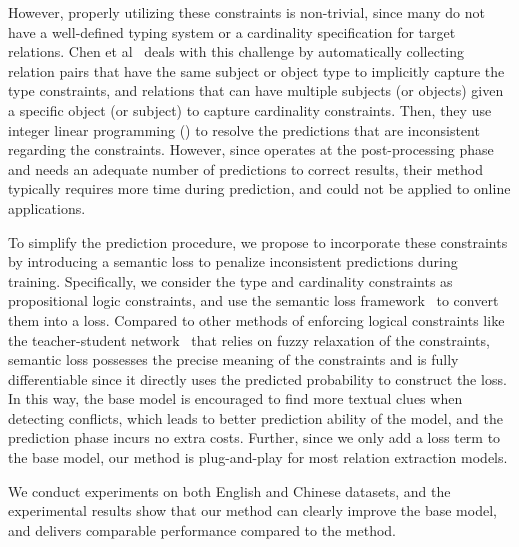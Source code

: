 However, properly utilizing these constraints is non-trivial, since many \KBs do not have a well-defined typing system or a cardinality specification for target relations.
Chen et al~ deals with this challenge by automatically collecting relation pairs that have the same subject or object type to implicitly capture the type constraints, and relations that can have multiple subjects (or objects) given a specific object (or subject) to capture cardinality constraints.
Then, they use  integer linear programming (\ILP) to resolve the predictions that are inconsistent regarding the constraints.
However, since \ILP operates at the post-processing phase and needs an adequate number of predictions to correct results, their method typically requires more time during prediction, 
and could not be applied to online applications.

To simplify the prediction procedure,
we propose to incorporate these constraints by introducing a semantic loss to penalize inconsistent predictions during training.
Specifically, we consider the type and cardinality constraints as propositional logic constraints, and use the semantic loss framework~\cite{xu2017semantic} to convert them into a loss.
Compared to other methods of enforcing logical constraints like the teacher-student network~\cite{hu2016harnessing} that relies on fuzzy relaxation of the constraints, semantic loss possesses the precise meaning of the constraints and is fully differentiable since it directly uses the predicted probability to construct the loss.
In this way, the base model is encouraged to find more textual clues when detecting conflicts, which leads to better prediction ability of the model, and the prediction phase incurs no extra costs.
Further, since we only add a loss term to the base model, our method is plug-and-play for most relation extraction models.

We conduct experiments on both English and Chinese datasets,
and the experimental results show that our method can clearly improve the base model, and delivers comparable performance compared to the \ILP method.

